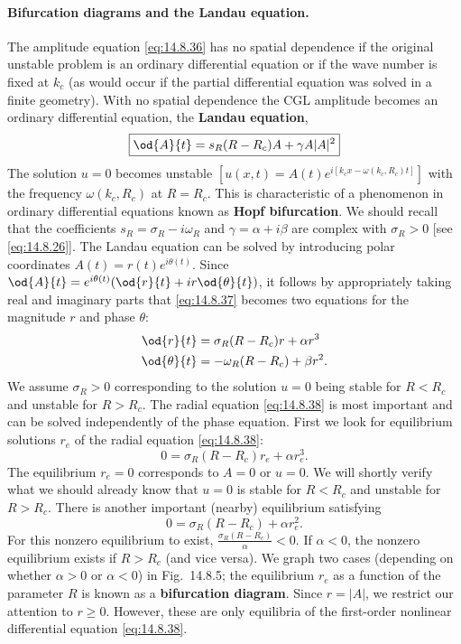 \paragraph{Bifurcation diagrams and the Landau equation.}
The amplitude equation \eqref{eq:14.8.36} has no spatial dependence if the original unstable problem is an ordinary differential equation or if the wave number is fixed at $k_c$ (as would occur if the partial differential equation was solved in a finite geometry). With no spatial dependence the CGL amplitude becomes an ordinary differential equation, the \textbf{Landau equation},
\begin{equation}
\boxed{\od{A}{t} = s_R(R - R_c)A + \gamma A|A|^2}
\label{eq:14.8.37}
\end{equation}
The solution $u = 0$ becomes unstable $[u(x,t) = A(t)e^{i[k_c x - \omega(k_c, R_c)t]}]$ with the frequency $\omega(k_c, R_c)$ at $R = R_c$. This is characteristic of a phenomenon in ordinary differential equations known as \textbf{Hopf bifurcation}. We should recall that the coefficients $s_R = \sigma_R - i\omega_R$ and $\gamma = \alpha + i\beta$ are complex with $\sigma_R > 0$ [see \eqref{eq:14.8.26}]. The Landau equation can be solved by introducing polar coordinates $A(t) = r(t)e^{i\theta(t)}$. Since $\od{A}{t} = e^{i\theta(t)}(\od{r}{t} + ir\od{\theta}{t})$, it follows by appropriately taking real and imaginary parts that \eqref{eq:14.8.37} becomes two equations for the magnitude $r$ and phase $\theta$:
\begin{align}
\od{r}{t} &= \sigma_R(R - R_c)r + \alpha r^3 \label{eq:14.8.38} \\
\od{\theta}{t} &= -\omega_R(R - R_c) + \beta r^2. \label{eq:14.8.39}
\end{align}
We assume $\sigma_R > 0$ corresponding to the solution $u = 0$ being stable for $R < R_c$ and unstable for $R > R_c$. The radial equation \eqref{eq:14.8.38} is most important and can be solved independently of the phase equation. First we look for equilibrium solutions $r_e$ of the radial equation \eqref{eq:14.8.38}:
\[
0 = \sigma_R(R - R_c)r_e + \alpha r_e^3.
\]
The equilibrium $r_e = 0$ corresponds to $A = 0$ or $u = 0$. We will shortly verify what we should already know that $u = 0$ is stable for $R < R_c$ and unstable for $R > R_c$. There is another important (nearby) equilibrium satisfying
\[
0 = \sigma_R(R - R_c) + \alpha r_e^2.
\]
For this nonzero equilibrium to exist, $\frac{\sigma_R(R - R_c)}{\alpha} < 0$. If $\alpha < 0$, the nonzero equilibrium exists if $R > R_c$ (and vice versa). We graph two cases (depending on whether $\alpha > 0$ or $\alpha < 0$) in Fig.\ 14.8.5; the equilibrium $r_e$ as a function of the parameter $R$ is known as a \textbf{bifurcation diagram}. Since $r = |A|$, we restrict our attention to $r \geq 0$. However, these are only equilibria of the first-order nonlinear differential equation \eqref{eq:14.8.38}.

